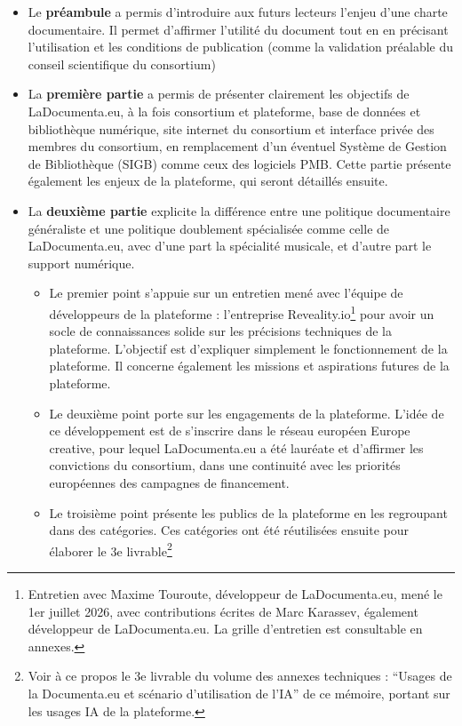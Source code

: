 \begin{itemize}
	\item Le \textbf{préambule} a permis d'introduire aux futurs lecteurs l'enjeu d'une charte documentaire. Il permet d'affirmer l'utilité du document tout en en précisant l'utilisation et les conditions de publication (comme la validation préalable du conseil scientifique du consortium)
	\item La \textbf{première partie} a permis de présenter clairement les objectifs de LaDocumenta.eu, à la fois consortium et plateforme, base de données et bibliothèque numérique, site internet du consortium et interface privée des membres du consortium, en remplacement d'un éventuel Système de Gestion de Bibliothèque (SIGB) comme ceux des logiciels PMB. 
	Cette partie présente également les enjeux de la plateforme, qui seront détaillés ensuite. 
	\item La \textbf{deuxième partie} explicite la différence entre une politique documentaire généraliste et une politique doublement spécialisée comme celle de LaDocumenta.eu, avec d'une part la spécialité musicale, et d'autre part le support numérique.
	
	\begin{itemize}
		\item Le premier point s'appuie sur un entretien mené avec l'équipe de développeurs de la plateforme : l'entreprise Reveality.io\footnote{Entretien avec Maxime Touroute, développeur de LaDocumenta.eu, mené le 1er juillet 2026, avec contributions écrites de Marc Karassev, également développeur de LaDocumenta.eu. La grille d'entretien est consultable en annexes.} pour avoir un socle de connaissances solide sur les précisions techniques de la plateforme. L'objectif est d'expliquer simplement le fonctionnement de la plateforme. 
		Il concerne également les missions et aspirations futures de la plateforme.
		
		\item Le deuxième point porte sur les engagements de la plateforme. L'idée de ce développement est de s'inscrire dans le réseau européen Europe creative, pour lequel LaDocumenta.eu a été lauréate et d'affirmer les convictions du consortium, dans une continuité avec les priorités européennes des campagnes de financement. 
		
		\item Le troisième point présente les publics de la plateforme en les regroupant dans des catégories. Ces catégories ont été réutilisées ensuite pour élaborer le 3e livrable\footnote{Voir à ce propos le 3e livrable du volume des annexes techniques : \enquote{Usages de la Documenta.eu et scénario d'utilisation de l'IA} de ce mémoire, portant sur les usages IA de la plateforme.} 
		

\end{itemize}
\end{itemize}
